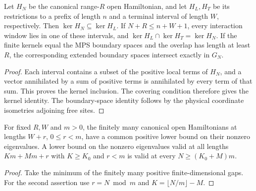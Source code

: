 \begin{lemma}
    \label{thm:open_cover_energy_kernel}
    \leanok
    Let $H_N$ be the canonical range-$R$ open Hamiltonian, and let $H_L,H_T$
    be its restrictions to a prefix of length $n$ and a terminal interval of
    length $W$, respectively. Then $\ker H_N\subseteq\ker H_L$.
    If $N+R\le n+W+1$, every interaction window lies in one
    of these intervals, and
    $\ker H_L\cap\ker H_T=\ker H_N$.
    If the finite kernels equal the MPS boundary spaces and the overlap has
    length at least $R$, the corresponding extended boundary spaces intersect
    exactly in $G_N$.
\end{lemma}
\begin{proof}\leanok
    Each interval contains a subset of the positive local terms of $H_N$,
    and a vector annihilated by a sum of positive terms is annihilated by
    every term of that sum. This proves the kernel inclusion. The covering
    condition therefore gives the kernel identity. The boundary-space identity
    follows by the physical coordinate isometries adjoining free sites.
\end{proof}

\begin{lemma}
    \label{thm:finite_open_residue_gaps}
    \leanok
    For fixed $R,W$ and $m>0$, the finitely many canonical open Hamiltonians
    at lengths $W+r$, $0\le r<m$, have a common positive lower bound on
    their nonzero eigenvalues. A lower bound on the nonzero eigenvalues
    valid at all lengths $Km+Mm+r$ with $K\ge K_0$ and $r<m$ is valid at
    every $N\ge(K_0+M)m$.
\end{lemma}
\begin{proof}\leanok
    Take the minimum of the finitely many positive finite-dimensional gaps.
    For the second assertion use $r=N\bmod m$ and $K=\lfloor N/m\rfloor-M$.
\end{proof}

